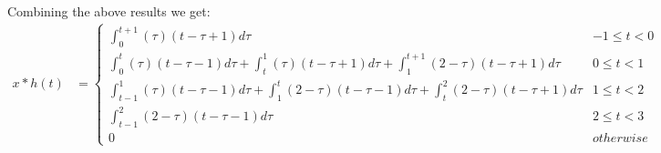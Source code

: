 \documentclass{article}
\begin{document}
Combining the above results we get:
\begin{equation*}
\begin{split}
    x * h(t)
    &= \begin{cases}
        \int_{0}^{t+1} (\tau) (t - \tau + 1)d\tau & -1 \leq t < 0\\
        \int_{0}^{t} (\tau)(t - \tau - 1)d \tau + \int_{t}^{1} (\tau)(t - \tau + 1)d \tau + \int_{1}^{t + 1} (2 - \tau)(t - \tau + 1)d \tau & 0 \leq t < 1\\
        \int_{t-1}^{1} (\tau)(t - \tau - 1)d \tau + \int_{1}^{t} (2 - \tau)(t - \tau - 1)d \tau + \int_{t}^{2} (2 - \tau)(t - \tau + 1)d \tau & 1 \leq t < 2\\
        \int_{t-1}^{2} (2 - \tau)(t - \tau - 1)d \tau & 2 \leq t < 3\\
        0 & otherwise
    \end{cases}\\
\end{split}
\end{equation*}
\end{document}
